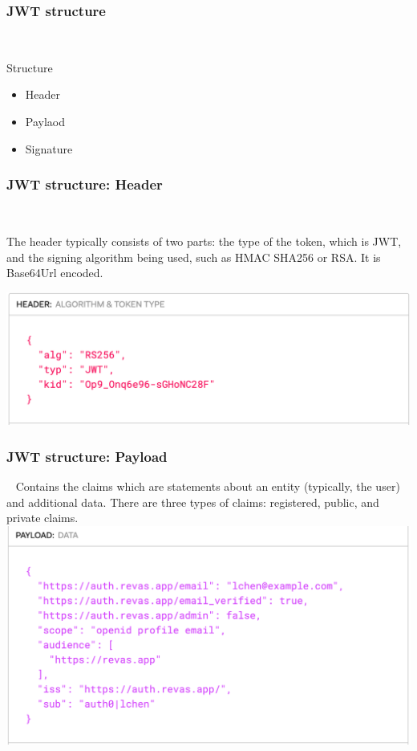 \documentclass{beamer}
\begin{document}
\begin{frame}
	\frametitle{JWT structure}\ \newline
	
	Structure
	\begin{itemize}	
		 \item Header
		 \item Paylaod
		 \item Signature
	\end{itemize}

\end{frame}

\begin{frame}
	\frametitle{JWT structure: Header }\ \newline
	
	The header typically consists of two parts: the type of the token, which is JWT, and the signing algorithm being used, such as HMAC SHA256 or RSA. It is Base64Url encoded.

\includegraphics[width=\textwidth]{./resources/revas-header}

\end{frame}

\begin{frame}
	\frametitle{JWT structure: Payload }\ \newline
	 Contains the claims which are statements about an entity (typically, the user) and additional data. There are three types of claims: registered, public, and private claims.
	\includegraphics[width=\textwidth]{./resources/revas-payload}

\end{frame}
\end{document}
